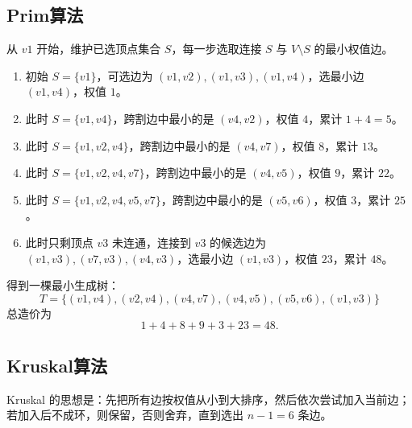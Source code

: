 \documentclass[utf8]{ctexart}
\theoremstyle{mystyle}
\begin{document}
\subsection*{Prim算法}
从 $v1$ 开始，维护已选顶点集合 $S$，每一步选取连接 $S$ 与 $V\setminus S$ 的最小权值边。
\begin{enumerate}
  \item 初始 $S=\{v1\}$，可选边为 $(v1,v2),(v1,v3),(v1,v4)$，选最小边 $(v1,v4)$，权值 $1$。
  \item 此时 $S=\{v1,v4\}$，跨割边中最小的是 $(v4,v2)$，权值 $4$，累计 $1+4=5$。
  \item 此时 $S=\{v1,v2,v4\}$，跨割边中最小的是 $(v4,v7)$，权值 $8$，累计 $13$。
  \item 此时 $S=\{v1,v2,v4,v7\}$，跨割边中最小的是 $(v4,v5)$，权值 $9$，累计 $22$。
  \item 此时 $S=\{v1,v2,v4,v5,v7\}$，跨割边中最小的是 $(v5,v6)$，权值 $3$，累计 $25$。
  \item 此时只剩顶点 $v3$ 未连通，连接到 $v3$ 的候选边为 $(v1,v3),(v7,v3),(v4,v3)$，选最小边 $(v1,v3)$，权值 $23$，累计 $48$。
\end{enumerate}
得到一棵最小生成树：
\[
T=\{(v1,v4),(v2,v4),(v4,v7),(v4,v5),(v5,v6),(v1,v3)\}
\]
总造价为
\[
1+4+8+9+3+23=48.
\]

\subsection*{Kruskal算法}
Kruskal 的思想是：先把所有边按权值从小到大排序，然后依次尝试加入当前边；若加入后不成环，则保留，否则舍弃，直到选出 $n-1=6$ 条边。
\end{document}
